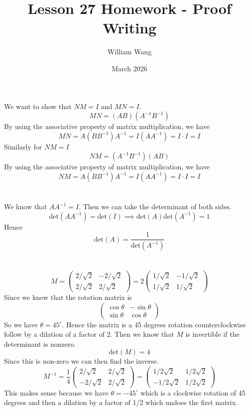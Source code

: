\documentclass{article}
\title{Lesson 27 Homework - Proof Writing}
\author{William Wang}
\date{March 2026}
\begin{document}
\maketitle

\section{}
We want to show that \(NM = I\) and \(MN = I\). 
\[MN = (AB)(A^{-1}B^{-1})\]
By using the associative property of matrix multiplication, we have 
\[MN = A(BB^{-1})A^{-1} = I(AA^{-1}) = I\cdot I = I\]
Similarly for \(NM = I\)
\[NM = (A^{-1}B^{-1})(AB)\]
By using the associative property of matrix multiplication, we have
\[NM = A(BB^{-1})A^{-1} = I(AA^{-1}) = I\cdot I = I\]
\section{}
We know that \(AA^{-1} = I\). Then we can take the determinant of both sides. 
\[\text{det}(AA^{-1}) = \text{det}(I) \implies \text{det}(A)\text{det}(A^{-1}) = 1\]
Hence 
\[\text{det}(A) = \frac{1}{\text{det}(A^{-1})}\]


\section{}
\subsection{}
\[M = \begin{pmatrix}
    2/\sqrt{2}&-2/\sqrt{2} \\ 2/\sqrt{2}&2/\sqrt{2}
\end{pmatrix} = 2\begin{pmatrix}
    1/\sqrt{2}&-1/\sqrt{2} \\ 1/\sqrt{2}&1/\sqrt{2} 
\end{pmatrix}\]
Since we know that the rotation matrix is 
\[\begin{pmatrix}
    \cos\theta&-\sin\theta \\ \sin\theta&\cos\theta
\end{pmatrix}\]
So we have \(\theta = 45^\circ\). Hence the matrix is a 45 degrees rotation counterclockwise follow by a dilation of a factor of 2. Then we know that \(M\) is invertible if the determinant is nonzero.
\[\text{det}(M) = 4\]
Since this is non-zero we can then find the inverse. 
\[M^{-1} = \frac{1}{4}\begin{pmatrix}
    2/\sqrt{2}&2/\sqrt{2} \\ -2/\sqrt{2}&2/\sqrt{2}
\end{pmatrix} = \begin{pmatrix}
    1/2\sqrt{2}&1/2\sqrt{2} \\ -1/2\sqrt{2}&1/2\sqrt{2} 
\end{pmatrix}\]
This makes sense because we have \(\theta = -45^\circ\) which is a clockwise rotation of 45 degrees and then a dilation by a factor of 1/2 which undoes the first matrix. 
\end{document}
